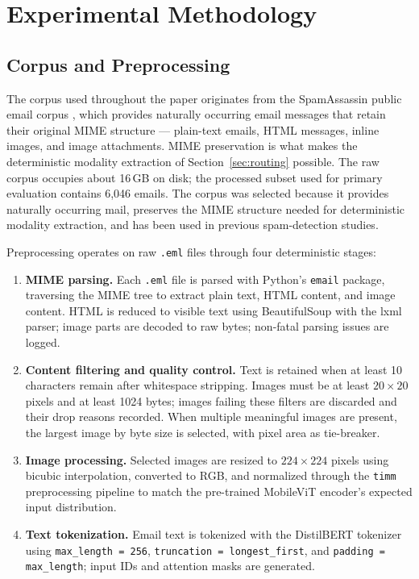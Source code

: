 \documentclass[10pt,twoside]{article}
\newcommand{\code}[1]{\texttt{#1}}
\begin{document}
\section{Experimental Methodology}\label{sec:methodology}

\subsection{Corpus and Preprocessing}\label{sec:preprocessing}

The corpus used throughout the paper originates from the SpamAssassin public email corpus \citep{spamassassin2006}, which provides naturally occurring email messages that retain their original MIME structure --- plain-text emails, HTML messages, inline images, and image attachments. MIME preservation is what makes the deterministic modality extraction of Section~\ref{sec:routing} possible. The raw corpus occupies about 16\,GB on disk; the processed subset used for primary evaluation contains 6,046 emails. The corpus was selected because it provides naturally occurring mail, preserves the MIME structure needed for deterministic modality extraction, and has been used in previous spam-detection studies.

Preprocessing operates on raw \code{.eml} files through four deterministic stages:

\begin{enumerate}
\item \textbf{MIME parsing.} Each \code{.eml} file is parsed with Python's \code{email} package, traversing the MIME tree to extract plain text, HTML content, and image content. HTML is reduced to visible text using BeautifulSoup with the lxml parser; image parts are decoded to raw bytes; non-fatal parsing issues are logged.
\item \textbf{Content filtering and quality control.} Text is retained when at least 10 characters remain after whitespace stripping. Images must be at least $20 \times 20$ pixels and at least 1024 bytes; images failing these filters are discarded and their drop reasons recorded. When multiple meaningful images are present, the largest image by byte size is selected, with pixel area as tie-breaker.
\item \textbf{Image processing.} Selected images are resized to $224 \times 224$ pixels using bicubic interpolation, converted to RGB, and normalized through the \code{timm} preprocessing pipeline \citep{wightman2019timm} to match the pre-trained MobileViT encoder's expected input distribution.
\item \textbf{Text tokenization.} Email text is tokenized with the DistilBERT tokenizer using \code{max\_length = 256}, \code{truncation = longest\_first}, and \code{padding = max\_length}; input IDs and attention masks are generated.
\end{enumerate}
\end{document}
